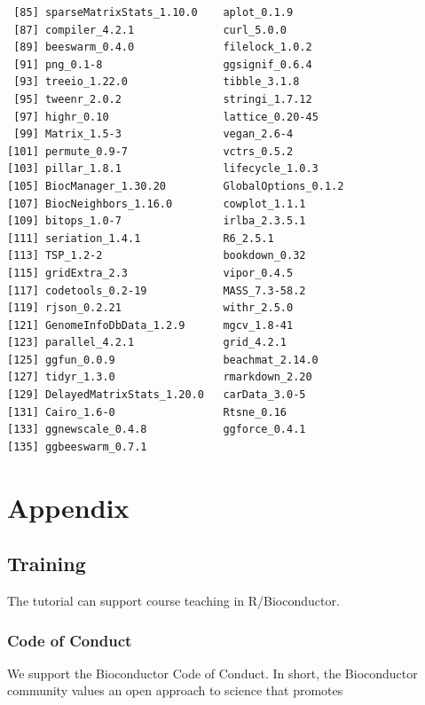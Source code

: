 \documentclass[
]{book}
\begin{document}
\begin{verbatim}
 [85] sparseMatrixStats_1.10.0    aplot_0.1.9                
 [87] compiler_4.2.1              curl_5.0.0                 
 [89] beeswarm_0.4.0              filelock_1.0.2             
 [91] png_0.1-8                   ggsignif_0.6.4             
 [93] treeio_1.22.0               tibble_3.1.8               
 [95] tweenr_2.0.2                stringi_1.7.12             
 [97] highr_0.10                  lattice_0.20-45            
 [99] Matrix_1.5-3                vegan_2.6-4                
[101] permute_0.9-7               vctrs_0.5.2                
[103] pillar_1.8.1                lifecycle_1.0.3            
[105] BiocManager_1.30.20         GlobalOptions_0.1.2        
[107] BiocNeighbors_1.16.0        cowplot_1.1.1              
[109] bitops_1.0-7                irlba_2.3.5.1              
[111] seriation_1.4.1             R6_2.5.1                   
[113] TSP_1.2-2                   bookdown_0.32              
[115] gridExtra_2.3               vipor_0.4.5                
[117] codetools_0.2-19            MASS_7.3-58.2              
[119] rjson_0.2.21                withr_2.5.0                
[121] GenomeInfoDbData_1.2.9      mgcv_1.8-41                
[123] parallel_4.2.1              grid_4.2.1                 
[125] ggfun_0.0.9                 beachmat_2.14.0            
[127] tidyr_1.3.0                 rmarkdown_2.20             
[129] DelayedMatrixStats_1.20.0   carData_3.0-5              
[131] Cairo_1.6-0                 Rtsne_0.16                 
[133] ggnewscale_0.4.8            ggforce_0.4.1              
[135] ggbeeswarm_0.7.1           
\end{verbatim}

\hypertarget{part-appendix}{%
\part{Appendix}\label{part-appendix}}

\hypertarget{training}{%
\chapter{Training}\label{training}}

The tutorial can support course teaching in R/Bioconductor.

\hypertarget{coc}{%
\section{Code of Conduct}\label{coc}}

We support the Bioconductor Code of Conduct. In short, the Bioconductor community values an open approach to science that promotes
\end{document}
